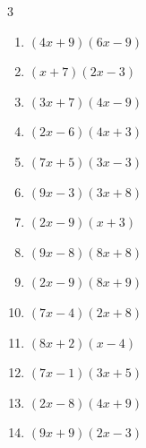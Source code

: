 \begin{multicols}{3}
\begin{enumerate}

  \item $(4x+9)(6x-9)$


  \item $(x+7)(2x-3)$


  \item $(3x+7)(4x-9)$


  \item $(2x-6)(4x+3)$


  \item $(7x+5)(3x-3)$


  \item $(9x-3)(3x+8)$


  \item $(2x-9)(x+3)$


  \item $(9x-8)(8x+8)$


  \item $(2x-9)(8x+9)$


  \item $(7x-4)(2x+8)$


\columnbreak %

\resetques

  \item $(8x+2)(x-4)$


  \item $(7x-1)(3x+5)$


  \item $(2x-8)(4x+9)$


  \item $(9x+9)(2x-3)$


\end{enumerate}
\end{multicols}
